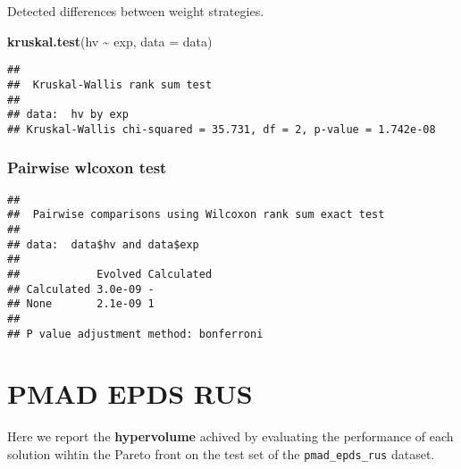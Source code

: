 \documentclass[
]{book}
\newenvironment{Shaded}{\begin{snugshade}}{\end{snugshade}}
\newcommand{\AttributeTok}[1]{\textcolor[rgb]{0.13,0.29,0.53}{#1}}
\newcommand{\ConstantTok}[1]{\textcolor[rgb]{0.56,0.35,0.01}{#1}}
\newcommand{\FunctionTok}[1]{\textcolor[rgb]{0.13,0.29,0.53}{\textbf{#1}}}
\newcommand{\NormalTok}[1]{#1}
\newcommand{\SpecialCharTok}[1]{\textcolor[rgb]{0.81,0.36,0.00}{\textbf{#1}}}
\newcommand{\StringTok}[1]{\textcolor[rgb]{0.31,0.60,0.02}{#1}}
\begin{document}
Detected differences between weight strategies.

\begin{Shaded}
\begin{Highlighting}[]
\FunctionTok{kruskal.test}\NormalTok{(hv }\SpecialCharTok{\textasciitilde{}}\NormalTok{ exp, }\AttributeTok{data =}\NormalTok{ data)}
\end{Highlighting}
\end{Shaded}

\begin{verbatim}
## 
##  Kruskal-Wallis rank sum test
## 
## data:  hv by exp
## Kruskal-Wallis chi-squared = 35.731, df = 2, p-value = 1.742e-08
\end{verbatim}

\hypertarget{pairwise-wlcoxon-test-10}{%
\subsection{Pairwise wlcoxon test}\label{pairwise-wlcoxon-test-10}}

\begin{Shaded}
\end{Shaded}

\begin{verbatim}
## 
##  Pairwise comparisons using Wilcoxon rank sum exact test 
## 
## data:  data$hv and data$exp 
## 
##            Evolved Calculated
## Calculated 3.0e-09 -         
## None       2.1e-09 1         
## 
## P value adjustment method: bonferroni
\end{verbatim}

\hypertarget{pmad-epds-rus}{%
\chapter{PMAD EPDS RUS}\label{pmad-epds-rus}}

Here we report the \textbf{hypervolume} achived by evaluating the performance of each solution wihtin the Pareto front on the test set of the \texttt{pmad\_epds\_rus} dataset.
\end{document}
